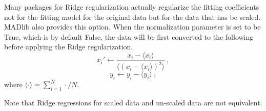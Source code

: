 Many packages for Ridge regularization actually regularize the fitting
coefficients not for the fitting model for the original data but for
the data that has be scaled. MADlib also provides this option. When
the normalization parameter is set to be True, which is by default
False, the data will be first converted to the following before
applying the Ridge regularization.
\begin{equation}
  x_i' \leftarrow \frac{x_i - \langle x_i \rangle}{\langle (x_i -
    \langle x_i \rangle)^2\rangle} \ ,
\end{equation}
\begin{equation}
y_i \leftarrow y_i - \langle y_i \rangle \ ,
\end{equation}
where $\langle \cdot \rangle = \sum_{i=1}^{N} \cdot / N$.

Note that Ridge regressions for scaled data and un-scaled data are not equivalent.

